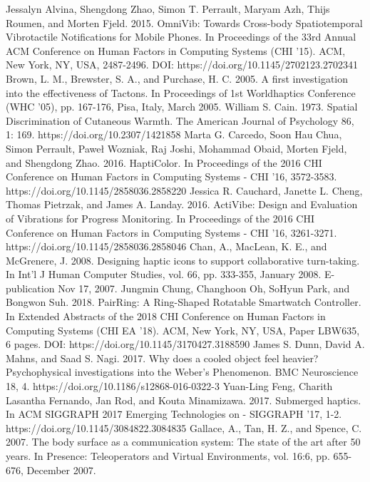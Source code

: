 \documentclass[preprint,12pt]{elsarticle}
\begin{document}
\begin{thebibliography}{00}

Jessalyn Alvina, Shengdong Zhao, Simon T. Perrault, Maryam Azh, Thijs Roumen, and Morten Fjeld. 2015. OmniVib: Towards Cross-body Spatiotemporal Vibrotactile Notifications for Mobile Phones. In Proceedings of the 33rd Annual ACM Conference on Human Factors in Computing Systems (CHI '15). ACM, New York, NY, USA, 2487-2496. DOI: https://doi.org/10.1145/2702123.2702341
Brown, L. M., Brewster, S. A., and Purchase, H. C. 2005. A first investigation into the effectiveness of Tactons. In Proceedings of 1st Worldhaptics Conference (WHC '05), pp. 167-176, Pisa, Italy, March 2005.
William S. Cain. 1973. Spatial Discrimination of Cutaneous Warmth. The American Journal of Psychology 86, 1: 169. https://doi.org/10.2307/1421858
Marta G. Carcedo, Soon Hau Chua, Simon Perrault, Paweł Wozniak, Raj Joshi, Mohammad Obaid, Morten Fjeld, and Shengdong Zhao. 2016. HaptiColor. In Proceedings of the 2016 CHI Conference on Human Factors in Computing Systems - CHI '16, 3572-3583. https://doi.org/10.1145/2858036.2858220
Jessica R. Cauchard, Janette L. Cheng, Thomas Pietrzak, and James A. Landay. 2016. ActiVibe: Design and Evaluation of Vibrations for Progress Monitoring. In Proceedings of the 2016 CHI Conference on Human Factors in Computing Systems - CHI '16, 3261-3271. https://doi.org/10.1145/2858036.2858046
Chan, A., MacLean, K. E., and McGrenere, J. 2008. Designing haptic icons to support collaborative turn-taking. In Int'l J Human Computer Studies, vol. 66, pp. 333-355, January 2008. E-publication Nov 17, 2007.
Jungmin Chung, Changhoon Oh, SoHyun Park, and Bongwon Suh. 2018. PairRing: A Ring-Shaped Rotatable Smartwatch Controller. In Extended Abstracts of the 2018 CHI Conference on Human Factors in Computing Systems (CHI EA '18). ACM, New York, NY, USA, Paper LBW635, 6 pages. DOI: https://doi.org/10.1145/3170427.3188590
James S. Dunn, David A. Mahns, and Saad S. Nagi. 2017. Why does a cooled object feel heavier? Psychophysical investigations into the Weber's Phenomenon. BMC Neuroscience 18, 4. https://doi.org/10.1186/s12868-016-0322-3
Yuan-Ling Feng, Charith Lasantha Fernando, Jan Rod, and Kouta Minamizawa. 2017. Submerged haptics. In ACM SIGGRAPH 2017 Emerging Technologies on - SIGGRAPH '17, 1-2. https://doi.org/10.1145/3084822.3084835
Gallace, A., Tan, H. Z., and Spence, C. 2007. The body surface as a communication system: The state of the art after 50 years. In Presence: Teleoperators and Virtual Environments, vol. 16:6, pp. 655-676, December 2007.

\end{thebibliography}
\end{document}
